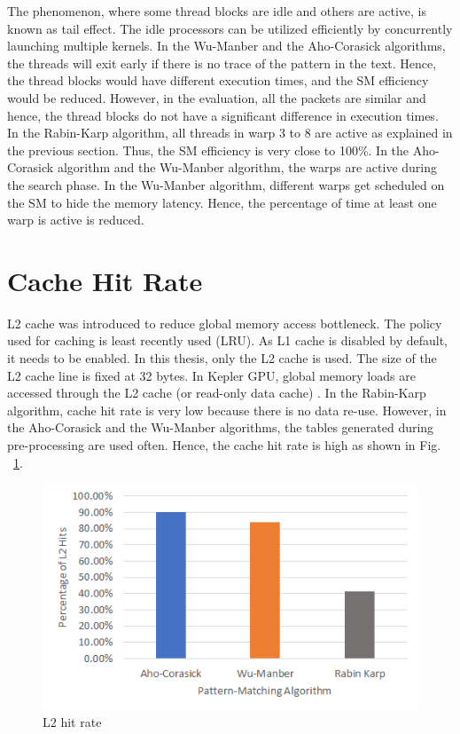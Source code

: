 The phenomenon, where some thread blocks are idle and others are active, is known as tail effect. The idle processors can be utilized efficiently by concurrently launching multiple kernels.
In the Wu-Manber and the Aho-Corasick algorithms, the threads will exit early if there is no trace of the pattern in the text. Hence, the thread blocks would have different execution times, and the SM efficiency would be reduced. However, in the evaluation, all the packets are similar and hence, the thread blocks do not have a significant difference in execution times. In the Rabin-Karp algorithm, all threads in warp 3 to 8 are active as explained in the previous section. Thus, the SM efficiency is very close to 100\%. In the Aho-Corasick algorithm and the Wu-Manber algorithm, the warps are active during the search phase. In the Wu-Manber algorithm, different warps get scheduled on the SM to hide the memory latency. Hence, the percentage of time at least one warp is active is reduced.

\section{Cache Hit Rate}

L2 cache was introduced to reduce global memory access bottleneck. The policy used for caching is least recently used (LRU). As L1 cache is disabled by default, it needs to be enabled. In this thesis, only the L2 cache is used. The size of the L2 cache line is fixed at 32 bytes. In Kepler GPU, global memory loads are accessed through the L2 cache (or read-only data cache) \cite{bib5}. In the Rabin-Karp algorithm, cache hit rate is very low because there is no data re-use. However, in the Aho-Corasick and the Wu-Manber algorithms, the tables generated during pre-processing are used often. Hence, the cache hit rate is high as shown in Fig. ~\ref{fig:cachehitrate}.

\begin{figure}[H]
	\centering
	\includegraphics[width=12cm]{cachehitrate.png}
	\caption{L2 hit rate}
	\label{fig:cachehitrate}
\end{figure}
\squeezeup

